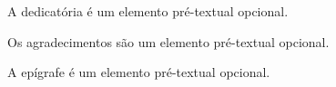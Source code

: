 \documentclass[ppgcc]{fearp}
\begin{document}
\imprimircapa
\imprimirfolhaderosto


\begin{dedicatoria}
\begin{flushright}
\vspace*{\fill}
\begin{minipage}{.52\textwidth}
A dedicatória é um elemento pré-textual opcional.
\end{minipage}
\end{flushright}
\end{dedicatoria}
\begin{agradecimentos}
Os agradecimentos são um elemento pré-textual opcional.
\end{agradecimentos}

\begin{epigrafe}
\begin{flushright}
\vspace*{\fill}
\begin{minipage}{.52\textwidth}
A epígrafe é um elemento pré-textual opcional.
\end{minipage}
\end{flushright}
\end{epigrafe}
\end{document}
